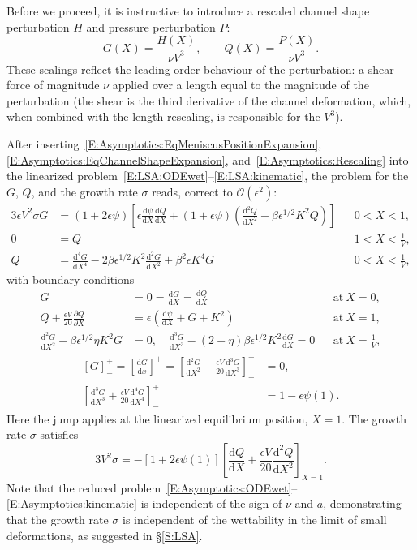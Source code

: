 \documentclass{jfm}
\newcommand{\dd}[2]{\frac{\mathrm{d} #1}{\mathrm{d} #2}}
\newcommand{\ddp}[2]{\frac{\partial #1}{\partial #2}}
\newcommand{\poisson}{\eta} %
\newcommand{\aspect}{a} %
\begin{document}
Before we proceed, it is instructive to introduce a rescaled channel shape perturbation $H$ and pressure perturbation $P$:
\begin{equation}\label{E:Asymptotics:Rescaling}
G(X) = \frac{H(X)}{\nu V^3}, \qquad Q(X) = \frac{P(X)}{\nu V^3}.
\end{equation}
These scalings reflect the leading order behaviour of the perturbation: a shear force of magnitude $\nu$ applied over a length equal to  the magnitude  of  the  perturbation  (the  shear  is  the  third  derivative  of  the  channel deformation, which, when combined with the length rescaling, is responsible for the $V^3$). 

After inserting~\eqref{E:Asymptotics:EqMeniscusPositionExpansion}, \eqref{E:Asymptotics:EqChannelShapeExpansion}, and~\eqref{E:Asymptotics:Rescaling} into the linearized problem~\eqref{E:LSA:ODEwet}--\eqref{E:LSA:kinematic}, the problem for the $G$, $Q$, and the growth rate $\sigma$ reads, correct to $\mathcal{O}(\epsilon^2)$:
\begin{align}
3\epsilon V^2 \sigma G &= \left(1 + 2\epsilon \psi\right)\left[\epsilon\dd{\psi}{X} \dd{Q}{X} + \left(1 + \epsilon \psi\right)\left(\dd{^2 Q}{X^2} - \beta \epsilon^{1/2} K^2 Q\right)\right] & &0 < X < 1,\label{E:Asymptotics:ODEwet}\\
0 &= Q & &1 < X < \frac{1}{V},\label{E:Asymptotics:ODEdry}\\
Q &= \dd{^4 G}{X^4} - 2\beta \epsilon^{1/2} K^2 \dd{^2 G}{X^2} +\beta^2 \epsilon K^4 G & &0 < X<\frac{1}{V},\label{A:Asymptotics:state_BVP:pressure2shape}
\end{align}
with boundary conditions
\begin{align}
G &= 0 = \dd{G}{X} = \dd{Q}{X} & &\text{at}~X = 0,\label{E:Asymptotics:BC_at_0}\\
Q + \frac{\epsilon V}{20}\ddp{Q}{X} &= \epsilon\left(\dd{\psi}{X} + G + K^2\right)  & &\text{at}~X= 1,\label{E:Asymptotics:pressure_bc}\\
\dd{^2 G}{X^2} -\beta \epsilon^{1/2} \poisson K^2 G &= 0, \quad  \dd{^3 G}{X^3} - (2-\poisson)\beta \epsilon^{1/2} K^2 \dd{G}{X} = 0 & &\text{at}~X = \frac{1}{V},\label{E:Asymptotics:BC_at_1}
\end{align}
\begin{align}\label{E:Asymptotics:jump_conds}
\left[G\right]_-^+= \left[\dd{G}{x}\right]_-^+ = \left[\dd{^2G}{X^2} + \frac{\epsilon V}{20}\dd{^3 G}{X^3}\right]_-^+&= 0, \\
\left[\dd{^3 G}{X^3} + \frac{\epsilon V}{20}\dd{^4 G}{X^4}\right]_-^+ &= 1 - \epsilon \psi(1).
\end{align}
Here the jump applies at the linearized equilibrium position, $X = 1$. The growth rate $\sigma$ satisfies
\begin{equation}\label{E:Asymptotics:kinematic}
3V^2\sigma = -\left[1 + 2\epsilon \psi(1)\right]\left[\dd{Q}{X} + \frac{\epsilon V}{20}\dd{^2 Q}{X^2}\right]_{X = 1}.
\end{equation}
Note that the reduced problem~\eqref{E:Asymptotics:ODEwet}--\eqref{E:Asymptotics:kinematic} is independent of the sign of $\nu$ and $\aspect$, demonstrating that the growth rate $\sigma$ is independent of the wettability in the limit of small deformations, as suggested in \S\ref{S:LSA}.
\end{document}
